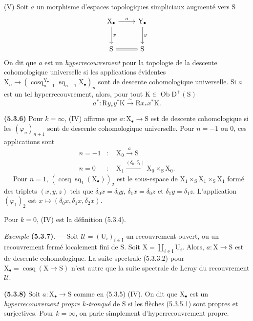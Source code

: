 \documentclass[11pt,leqno]{article}
\newcommand{\Page}[1]{\ifvmode\noindent\else\unskip\ \fi{\footnotesize\textcolor{gray}{[p.\,#1]}}\ \ignorespaces}
\begin{document}
(V) Soit \(a\) un morphisme d’espaces topologiques simpliciaux augmenté vers \(\mathrm{S}\)
\[
\begin{tikzcd}[column sep=2.5em,row sep=2.5em]
\mathrm{X}_{\bullet}\arrow[r,"a"]\arrow[d,"x"]
  & \mathrm{Y}_{\bullet}\arrow[d,"y"]\\
\mathrm{S}\arrow[r,equal] & \mathrm{S}
\end{tikzcd}
\]
On dit que \(a\) est un \textit{hyperrecouvrement} pour la topologie de la descente cohomologique universelle si les applications évidentes \(\mathrm{X}_n\to(\operatorname{cosq}_{n-1}^{\mathrm{Y}_{\bullet}}\operatorname{sq}_{n-1}\mathrm{X}_{\bullet})_n\) sont de descente cohomologique universelle. Si \(a\) est un tel hyperrecouvrement, alors, pour tout \(\mathrm{K}\in\operatorname{Ob}\mathrm{D}^{+}(\mathrm{S})\)
\[
a^*:\mathrm{R}y_*y^*\mathrm{K}\xrightarrow{\sim}\mathrm{R}x_*x^*\mathrm{K}.
\]

\textbf{(5.3.6)} Pour \(k=\infty\), (IV) affirme que \(a:\mathrm{X}_{\bullet}\to\mathrm{S}\) est de descente cohomologique si les \((\varphi_n)_{n+1}\) sont de descente cohomologique universelle. Pour \(n=-1\) ou \(0\), ces applications sont
\[
\begin{aligned}
n=-1&:\quad \mathrm{X}_0\xrightarrow{a}\mathrm{S}\\
n=0&:\quad \mathrm{X}_1\xrightarrow{(\delta_0,\delta_1)}
\mathrm{X}_0\times_{\mathrm{S}}\mathrm{X}_0.
\end{aligned}
\]
\Page{16}
Pour \(n=1\), \((\operatorname{cosq}\operatorname{sq}_1(\mathrm{X}_{\bullet}))_2\) est le sous-espace de \(\mathrm{X}_1\times_{\mathrm{S}}\mathrm{X}_1\times_{\mathrm{S}}\mathrm{X}_1\) formé des triplets \((x,y,z)\) tels que \(\delta_0x=\delta_0y\), \(\delta_1x=\delta_0z\) et \(\delta_1y=\delta_1z\). L’application \((\varphi_1)_2\) est \(x\mapsto(\delta_0x,\delta_1x,\delta_2x)\).

Pour \(k=0\), (IV) est la définition (5.3.4).

\textit{Exemple} \textbf{(5.3.7)}. — Soit \(\mathcal{U}=(\mathrm{U}_i)_{i\in\mathrm{I}}\) un recouvrement ouvert, ou un recouvrement fermé localement fini de \(\mathrm{S}\). Soit \(\mathrm{X}=\coprod\limits_{i\in\mathrm{I}}\mathrm{U}_i\). Alors, \(a:\mathrm{X}\to\mathrm{S}\) est de descente cohomologique. La suite spectrale (5.3.3.2) pour \(\mathrm{X}_{\bullet}=\operatorname{cosq}(\mathrm{X}\to\mathrm{S})\) n’est autre que la suite spectrale de Leray du recouvrement \(\mathcal{U}\).

\textbf{(5.3.8)} Soit \(a:\mathrm{X}_{\bullet}\to\mathrm{S}\) comme en (5.3.5) (IV). On dit que \(\mathrm{X}_{\bullet}\) est un \textit{hyperrecouvrement propre \(k\)-tronqué} de \(\mathrm{S}\) si les flèches (5.3.5.1) sont propres et surjectives. Pour \(k=\infty\), on parle simplement d’hyperrecouvrement propre.
\end{document}

